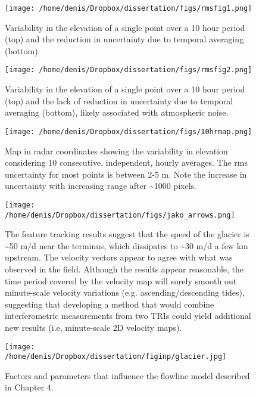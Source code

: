 \begin{figure}
\centering
\texttt{[image: /home/denis/Dropbox/dissertation/figs/rmsfig1.png]}
\caption[Variability in the elevation of a single point over a 10 hour period (top) and the reduction in uncertainty due to temporal averaging (bottom).]{Variability in the elevation of a single point over a 10 hour period (top) and the reduction in uncertainty due to temporal averaging (bottom).}
\label{fig:redunc}
\end{figure}

\begin{figure}
\centering
\texttt{[image: /home/denis/Dropbox/dissertation/figs/rmsfig2.png]}
\caption[Variability in the elevation of a single point over a 10 hour period (top) and the lack of reduction in uncertainty due to temporal averaging (bottom), likely associated with atmospheric noise.]{Variability in the elevation of a single point over a 10 hour period (top) and the lack of reduction in uncertainty due to temporal averaging (bottom), likely associated with atmospheric noise.}
\label{fig:noredunc}
\end{figure}


\begin{figure}
\centering
\texttt{[image: /home/denis/Dropbox/dissertation/figs/10hrmap.png]}
\caption[Map in radar coordinates showing the variability in elevation considering 10 consecutive, independent, hourly averages. ]{Map in radar coordinates showing the variability in elevation considering 10 consecutive, independent, hourly averages. The rms uncertainty for most points is between 2-5 m. Note the increase in uncertainty with increasing range after \textasciitilde1000 pixels.}
\label{fig:demerrmap}
\end{figure}
 

\begin{figure}
\centering
\texttt{[image: /home/denis/Dropbox/dissertation/figs/jako\_arrows.png]}
\caption[The feature tracking results suggest that the speed of the glacier is \textasciitilde40 m/d near the terminus, which dissipates to \textasciitilde30 m/d a few km upstream.]{The feature tracking results suggest that the speed of the glacier is \textasciitilde50 m/d near the terminus, which dissipates to \textasciitilde30 m/d a few km upstream. The velocity vectors appear to agree with what was observed in the field. Although the results appear reasonable, the time period covered by the velocity map will surely smooth out minute-scale velocity variations (e.g. ascending/descending tides), suggesting that developing a method that would combine interferometric measurements from two TRIs could yield additional new results (i.e, minute-scale 2D velocity maps). }
\label{fig:jakofeature}
\end{figure}


\begin{figure}
\centering
\texttt{[image: /home/denis/Dropbox/dissertation/figinp/glacier.jpg]}
\caption[Factors and parameters that influence the flowline model described in Chapter 4.]{Factors and parameters that influence the flowline model described in Chapter 4.}
\label{fig:flowlinemodel}
\end{figure}
 